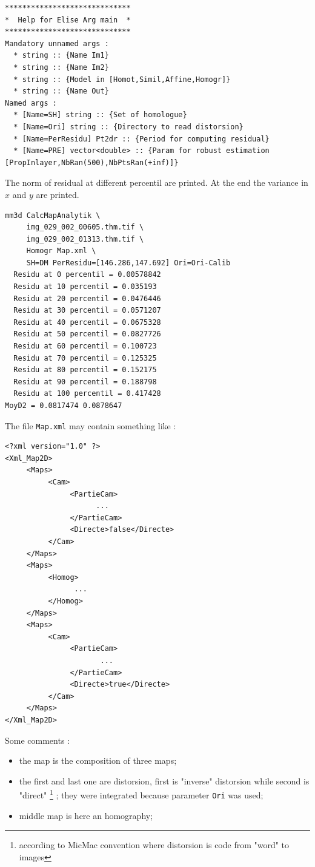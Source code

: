 \begin{verbatim}
*****************************
*  Help for Elise Arg main  *
*****************************
Mandatory unnamed args : 
  * string :: {Name Im1}
  * string :: {Name Im2}
  * string :: {Model in [Homot,Simil,Affine,Homogr]}
  * string :: {Name Out}
Named args : 
  * [Name=SH] string :: {Set of homologue}
  * [Name=Ori] string :: {Directory to read distorsion}
  * [Name=PerResidu] Pt2dr :: {Period for computing residual}
  * [Name=PRE] vector<double> :: {Param for robust estimation [PropInlayer,NbRan(500),NbPtsRan(+inf)]}
\end{verbatim}

The norm of residual at different percentil are printed. At the end the
variance in $x$ and $y$ are printed.


\begin{verbatim}
mm3d CalcMapAnalytik \
     img_029_002_00605.thm.tif \
     img_029_002_01313.thm.tif \
     Homogr Map.xml \
     SH=DM PerResidu=[146.286,147.692] Ori=Ori-Calib
  Residu at 0 percentil = 0.00578842
  Residu at 10 percentil = 0.035193
  Residu at 20 percentil = 0.0476446
  Residu at 30 percentil = 0.0571207
  Residu at 40 percentil = 0.0675328
  Residu at 50 percentil = 0.0827726
  Residu at 60 percentil = 0.100723
  Residu at 70 percentil = 0.125325
  Residu at 80 percentil = 0.152175
  Residu at 90 percentil = 0.188798
  Residu at 100 percentil = 0.417428
MoyD2 = 0.0817474 0.0878647
\end{verbatim}

The file {\tt  Map.xml} may contain something like :

{\tiny
\begin{verbatim}
<?xml version="1.0" ?>
<Xml_Map2D>
     <Maps>
          <Cam>
               <PartieCam>
                     ...
               </PartieCam>
               <Directe>false</Directe>
          </Cam>
     </Maps>
     <Maps>
          <Homog>
                ...
          </Homog>
     </Maps>
     <Maps>
          <Cam>
               <PartieCam>
                      ...
               </PartieCam>
               <Directe>true</Directe>
          </Cam>
     </Maps>
</Xml_Map2D>
\end{verbatim}
}

Some comments :

\begin{itemize}
   \item the map is the composition of three maps;

   \item the first and last one are distorsion, first is "inverse" distorsion 
         while second is "direct" \footnote{according to MicMac convention where 
         distorsion is code from "word" to images} ; they were integrated because
         parameter {\tt Ori} was used;

   \item middle map is here  an homography;
\end{itemize}


